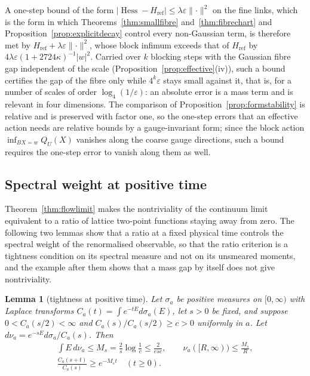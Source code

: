 \documentclass[11pt]{amsart}
\newtheorem{lemma}[theorem]{Lemma}
\theoremstyle{definition}
\theoremstyle{remark}
\numberwithin{equation}{section}
\begin{document}
A one-step bound of the form $\lvert\operatorname{Hess}-H_{\mathrm{ref}}
\rvert\le\lambda\varepsilon\lVert\cdot\rVert^2$ on the fine links, which is
the form in which Theorems~\ref{thm:smallfibre} and~\ref{thm:fibrechart}
and Proposition~\ref{prop:explicitdecay} control every non-Gaussian term,
is therefore met by $H_{\mathrm{ref}}+\lambda\varepsilon\lVert\cdot
\rVert^2$, whose block infimum exceeds that of $H_{\mathrm{ref}}$ by
$4\lambda\varepsilon(1+2724\kappa)^{-1}\lvert w\rvert^2$. Carried over $k$
blocking steps with the Gaussian fibre gap independent of the scale
(Proposition~\ref{prop:effective}(iv)), such a bound certifies the gap of
the fibre only while $4^k\varepsilon$ stays small against it, that is, for
a number of scales of order $\log_4(1/\varepsilon)$: an absolute error is a
mass term and is relevant in four dimensions. The comparison of
Proposition~\ref{prop:formstability} is relative and is preserved with
factor one, so the one-step errors that an effective action needs are
relative bounds by a gauge-invariant form; since the block action
$\inf_{BX=w}Q_U(X)$ vanishes along the coarse gauge directions, such a
bound requires the one-step error to vanish along them as well.

\subsection{Spectral weight at positive time}\label{ssec:spectralweight}

Theorem~\ref{thm:flowlimit} makes the nontriviality of the continuum limit
equivalent to a ratio of lattice two-point functions staying away from
zero. The following two lemmas show that a ratio at a fixed physical time
controls the spectral weight of the renormalised observable, so that the
ratio criterion is a tightness condition on its spectral measure and not
on its unsmeared moments, and the example after them shows that a mass
gap by itself does not give nontriviality.

\begin{lemma}[tightness at positive time]\label{lem:positivetime}
Let $\sigma_a$ be positive measures on $[0,\infty)$ with Laplace
transforms $C_a(t)=\int e^{-tE}d\sigma_a(E)$, let $s>0$ be fixed, and
suppose $0<C_a(s/2)<\infty$ and $C_a(s)/C_a(s/2)\ge c>0$ uniformly in $a$.
Let $d\nu_a=e^{-sE}d\sigma_a/C_a(s)$. Then
\[
\begin{gathered}
\int E\,d\nu_a\le M_s=\frac2s\log\frac1c\le\frac2{esc},\qquad
\nu_a([R,\infty))\le\frac{M_s}R,\\
\frac{C_a(s+t)}{C_a(s)}\ge e^{-M_st}\quad(t\ge0).
\end{gathered}
\]
\end{lemma}
\end{document}
